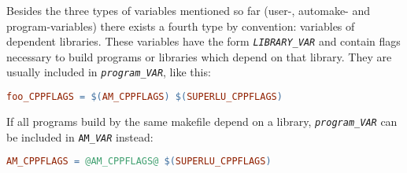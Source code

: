 \documentclass[11pt,a4paper,headinclude,footinclude,DIV16,normalheadings]{scrartcl}
\begin{document}
Besides the three types of variables mentioned so far (user-, automake- and
program-variables) there exists a fourth type by convention: variables of
dependent libraries.  These variables have the form
\texttt{\textit{LIBRARY}\_\textit{VAR}} and contain flags necessary to build
programs or libraries which depend on that library.  They are usually included
in \texttt{\textit{program}\_\textit{VAR}}, like this:
\begin{lstlisting}[language=make]
foo_CPPFLAGS = $(AM_CPPFLAGS) $(SUPERLU_CPPFLAGS)
\end{lstlisting}
If all programs build by the same makefile depend on a library,
\texttt{\textit{program}\_\textit{VAR}} can be included in
\texttt{AM\_\textit{VAR}} instead:
\begin{lstlisting}[language=make]
AM_CPPFLAGS = @AM_CPPFLAGS@ $(SUPERLU_CPPFLAGS)
\end{lstlisting}
\end{document}
